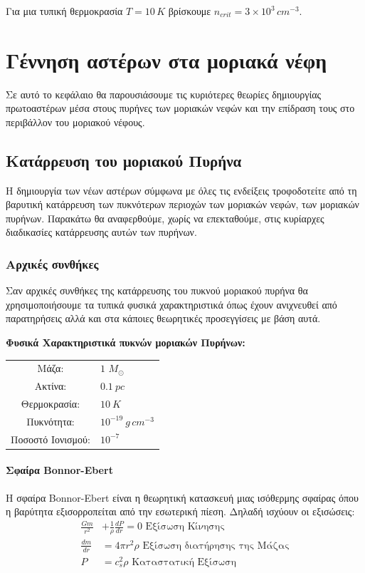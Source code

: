 \documentclass[a4paper,12pt]{memoir}
\newcommand{\sm}{$M_{\odot}$}
\begin{document}
Για μια τυπική θερμοκρασία $T=10 \, K$ βρίσκουμε $n_{crit}=3\times 10^3 \,cm^{-3}$.



\chapter{Γέννηση αστέρων στα μοριακά νέφη}
Σε αυτό το κεφάλαιο θα παρουσιάσουμε τις κυριότερες θεωρίες δημιουργίας πρωτοαστέρων μέσα στους πυρήνες των μοριακών νεφών και την επίδραση τους στο περιβάλλον του μοριακού νέφους.

\section{Κατάρρευση του μοριακού Πυρήνα}
Η δημιουργία των νέων αστέρων σύμφωνα με όλες τις ενδείξεις τροφοδοτείτε από τη βαρυτική κατάρρευση των πυκνότερων περιοχών των μοριακών νεφών, των μοριακών πυρήνων. Παρακάτω θα αναφερθούμε, χωρίς να επεκταθούμε, στις κυρίαρχες διαδικασίες κατάρρευσης αυτών των πυρήνων.

\subsection{Αρχικές συνθήκες}
Σαν αρχικές συνθήκες της κατάρρευσης του πυκνού μοριακού πυρήνα θα χρησιμοποιήσουμε τα τυπικά φυσικά χαρακτηριστικά όπως έχουν ανιχνευθεί από παρατηρήσεις αλλά και στα κάποιες θεωρητικές προσεγγίσεις με βάση αυτά.

\textbf{Φυσικά Χαρακτηριστικά πυκνών μοριακών Πυρήνων:}

\begin{tabular}{|c l}
	Μάζα: & $1$ \sm \\
	Ακτίνα: & $0.1 \ pc$ \\
	Θερμοκρασία: & $10 \ K$ \\
	Πυκνότητα: & $10^{-19} \ g \, cm^{-3}$ \\
	Ποσοστό Ιονισμού: & $10^{-7}$ 
\end{tabular}

\subsubsection{Σφαίρα Bonnor-Ebert}
Η σφαίρα Bonnor-Ebert είναι η θεωρητική κατασκευή μιας ισόθερμης σφαίρας όπου η βαρύτητα εξισορροπείται από την εσωτερική πίεση. Δηλαδή ισχύουν οι εξισώσεις:
\begin{align}
\frac{Gm}{r^2} &+\frac{1}{\rho}\frac{dP}{dr}=0 \text{ Εξίσωση Κίνησης}\\
\frac{dm}{dr} &= 4 \pi r^2 \rho \text{ Εξίσωση διατήρησης της Μάζας}\\
P &= c_s ^2 \rho \text{ Καταστατική Εξίσωση}
\end{align}
\end{document}

